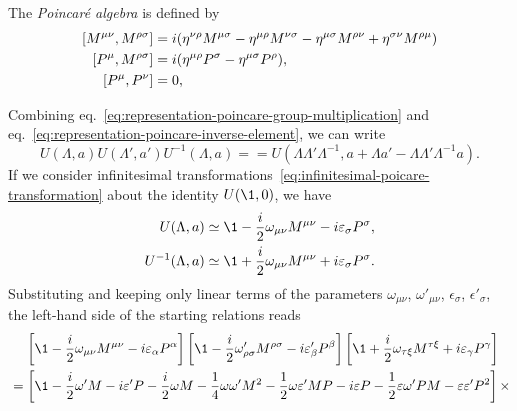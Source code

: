 The \emph{Poincaré algebra} is defined by
\begin{subequations}\label{eq:poincare-comm-relations}
    \begin{align}
        \comm{M^{\mu\nu}}{M^{\rho\sigma}} &= i ( \eta^{\nu\rho}M^{\mu\sigma} - \eta^{\mu\rho}M^{\nu\sigma} - \eta^{\mu\sigma}M^{\rho\nu} + \eta^{\sigma\nu}M^{\rho\mu}) \label{eq:comm-poincare-lorentz}\\
        \comm{P^\mu}{M^{\rho\sigma}} &= i (\eta^{\mu\rho} P^\sigma - \eta^{\mu\sigma} P^\rho),
        \label{eq:comm-poincare-lorentzmomentum}\\
        \comm{P^\mu}{P^\nu} &= 0 \label{eq:comm-poincare-momentum},
\end{align}
\end{subequations}
\begin{mdframed}
\begin{innerproof}
    Combining eq.~\eqref{eq:representation-poincare-group-multiplication} and eq.~\eqref{eq:representation-poincare-inverse-element}, we can write
    \begin{equation*}
        U(\Lambda, a) U(\Lambda',a') U^{-1}(\Lambda,a) =  = U(\Lambda \Lambda' \Lambda^{-1}, a + \Lambda a' - \Lambda \Lambda' \Lambda^{-1}a) .
    \end{equation*}
    If we consider infinitesimal transformations~\eqref{eq:infinitesimal-poicare-transformation} about the identity $U(\1,0)$, we have
    \begin{align*}
        U(\Lambda,a) &\simeq \1 -\frac{i}{2} \omega_{\mu\nu} M^{\mu\nu} - i \epsilon_\sigma P^\sigma, \\ 
        {U^{-1}}(\Lambda,a) &\simeq \1 +\frac{i}{2} \omega_{\mu\nu} M^{\mu\nu} + i \epsilon_\sigma P^\sigma .
    \end{align*}
    Substituting and keeping only linear terms of the parameters $\omega_{\mu\nu}$, $\omega'_{\mu\nu}$, $\epsilon_\sigma$, $\epsilon'_\sigma$, the left-hand side of the starting relations reads
    \begin{align*}
        &\quad \,\left[ \1 -\frac{i}{2} \omega_{\mu\nu} M^{\mu\nu} - i \epsilon_\alpha P^\alpha  \right] \left[ \1 -\frac{i}{2} \omega'_{\rho\sigma} M^{\rho\sigma} - i \epsilon'_\beta P^\beta  \right] \left[ \1 +\frac{i}{2} \omega_{\tau\xi} M^{\tau\xi} + i \epsilon_\gamma P^\gamma  \right] \\
        &=\left[ \1 - \frac{i}{2} \omega' M - i \epsilon' P - \frac{i}{2} \omega M - \frac{1}{4} \omega \omega' M^2 - \frac{1}{2} \omega \epsilon' M P - i \epsilon P - \frac{1}{2} \epsilon \omega' P M - \epsilon \epsilon' P^2 \right] \times \\

\end{align*}
\end{innerproof}
\end{mdframed}
